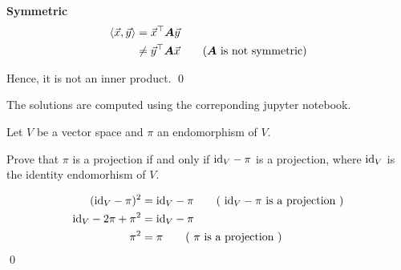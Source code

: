 \solution

\textbf{Symmetric}
\begin{align*}
	\innerprod \vecx \vecy &= \vecx^\top \mata \vecy \\
	&\neq \vecy^\top \mata \vecx \tag{$\mata$ is not symmetric}
\end{align*}

Hence, it is not an inner product. \qed

The solutions are computed using the correponding jupyter notebook.

Let $V$ be a vector space and $\pi$ an endomorphism of $V$.

Prove that $\pi$ is a projection if and only if $\text{id}_V - \pi$ is a projection, where $\text{id}_V$ is the identity endomorhism of $V$.

\begin{align*}
	(\id_V - \pi)^2 &= \id_V - \pi \tag{ $\id_V - \pi$ is a projection } \\
	\id_V - 2\pi + \pi^2 &= \id_V - \pi \\
	\pi^2 &= \pi \tag{ $\pi$ is a projection }
\end{align*}
\qed












































































